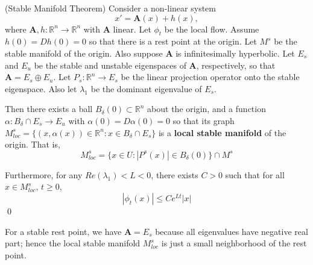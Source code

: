  \begin{theorem}(Stable Manifold Theorem)
 	Consider a non-linear system 
 	$$x' = \mathbf{A}(x) + h(x),$$ 
 	where $\mathbf{A}, h: \mathbb{R}^n \to \mathbb{R}^n$ with $\mathbf{A}$ linear.  Let $\phi_t$ be the local flow.
 	Assume $h(0) =  Dh(0)=0$ so that there is a rest point at the origin. Let $M^s$ be the stable manifold of the origin. 
 	Also suppose $\mathbf{A}$ is infinitesimally hyperbolic. Let $E_s$ and $E_u$ be the stable and unstable eigenspaces of $\mathbf{A}$, respectively, so that $\textbf{A} = E_s \oplus E_u$. Let $P_s: \mathbb{R}^n \to E_s$ %
 	be the linear projection operator onto the stable %
 	eigenspace. Also let $\lambda_1$ be the dominant eigenvalue of $E_s$. 
 	
 	Then there exists a ball $B_\delta(0) \subset \mathbb{R}^n$ about the origin, 
 	and a function $\alpha: B_\delta \cap E_s \to E_u $ with $\alpha(0)  = D\alpha(0) = 0$ 
 	so that its graph $M^s_{loc} = \{(x, \alpha(x)) \in \mathbb{R}^n : x \in B_\delta \cap E_s\}$ is a \textbf{local stable manifold} of the origin. 
 	That is, $$M^s_{loc} = \{x \in U : |P^s(x)| \in B_\delta(0)\} \cap M^s$$
 	
 	Furthermore, for any $Re(\lambda_1) < L < 0$, there exists $C >0$ such that for all $x \in M^s_{loc}$, $t \geq 0$,
 	$$|\phi_t(x)| \leq Ce^{Lt}|x|$$ \qed
 \end{theorem}

For a stable rest point, we have $\mathbf{A} = E_s$ because all eigenvalues have negative real part; hence the local stable manifold $M^s_{loc}$ is just a small neighborhood of the rest point. 